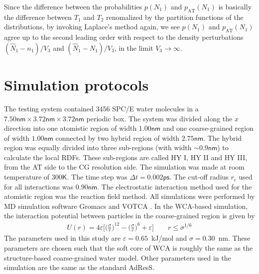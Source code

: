 \documentclass[aps,a4paper,reprint,onecolumn]{revtex4}
\newcommand{\AT}{{\textrm{{AT}}}}
\begin{document}
Since the difference between the probabilities
$p(N_1)$ and $p_{\AT}(N_1)$ is basically the difference between $T_1$
and $T_2$ renomalized by the partition functions of the distributions,
by
invoking Laplace's method again,
we see $p(N_1)$ and $p_{\AT}(N_1)$ agree up to
the second leading
order with respect to the density perturbations
$(\hat N_1 - n_1)/{V_3}$
and $(\hat N_1 - N_1)/{V_3}$,
in the limit $V_{3}\to\infty$.




\section{Simulation protocols}
\label{app:2}
The testing system contained 3456 SPC/E \cite{berendsen1987missing}
water molecules in a $7.50\textsf{nm}\times 3.72\textsf{nm}\times
3.72\textsf{nm}$ periodic box. The system was divided along the $x$ direction
into one atomistic region of width $1.00\textsf{nm}$ and one
coarse-grained region of width $1.00\textsf{nm}$ connected by two
hybrid region of width $2.75\textsf{nm}$.
The hybrid region was equally divided into three sub-regions (with width $\sim 0.9\textsf{nm}$)
to calculate the local RDFs.
These sub-regions are called HY I, HY II and HY III, from the AT side to the CG resolution side.
The simulation was made at
room temperature of $300\textsf{K}$. The time step was $\Delta t =
0.002\textsf{ps}$. The cut-off radius $r_{c}$ used for all interactions was
$0.90\textsf{nm}$. The electrostatic interaction method used for the
atomistic region was the reaction field method. All simulations were
performed by MD simulation software Gromacs \cite{gromacs}
and VOTCA \cite{ruehle2009versatile}.
In the WCA-based simulation, the interaction potential between particles in the coarse-grained region is given by
\begin{align}
  U(r) = 4\varepsilon
  \big[
  \big(\frac\sigma r\big)^{12}
  -
  \big(\frac\sigma r\big)^{6}
  + \varepsilon
  \big]
  \qquad  r\leq \sigma^{1/6}
\end{align}
The parameters used in this study are $\varepsilon = 0.65$~\textsf{kJ/mol}
and $\sigma = 0.30$~\textsf{nm}. These parameters are chosen such that
the soft core of WCA is roughly the same as the structure-based coarse-grained
water model.
Other parameters used in the simulation are the
same as the standard AdResS.
\end{document}
